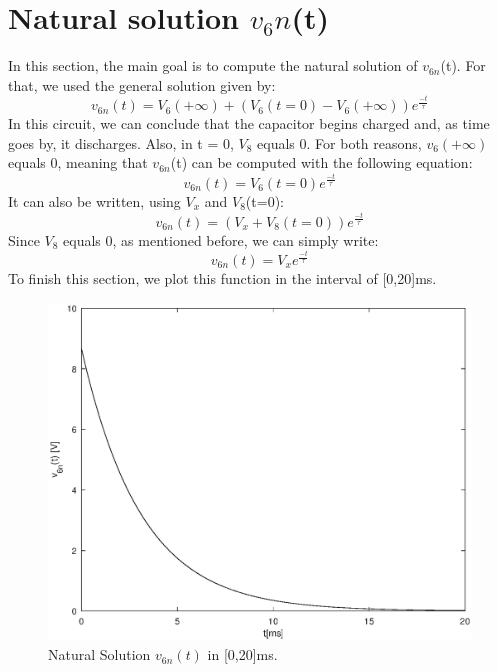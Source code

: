 \newpage
\section{Natural solution $v_6n$(t)}
In this section, the main goal is to compute the natural solution of $v_{6n}$(t). For that, we used the general solution given by:
\begin{equation}
v_{6n}(t) = V_6(+\infty) + (V_6(t=0) - V_6(+\infty))e^{\frac{-t}{\tau}}
  \label{eq:v6ncomplete}
\end{equation}
In this circuit, we can conclude that the capacitor begins charged and, as time goes by, it discharges. Also, in t = 0, $V_8$ equals 0. 
For both reasons, $v_6(+\infty)$ equals 0, meaning that $v_{6n}$(t) can be computed with the following equation:
\begin{equation}
v_{6n}(t) = V_6(t=0)e^{\frac{-t}{\tau}}
  \label{eq:v6nfinal}
\end{equation}
It can also be written, using $V_x$ and $V_8$(t=0):
\begin{equation}
v_{6n}(t) = (V_x + V_8(t=0))e^{\frac{-t}{\tau}}
  \label{eq:v6nwithv8vx}
\end{equation}
Since $V_8$ equals 0, as mentioned before, we can simply write:
\begin{equation}
v_{6n}(t) = V_xe^{\frac{-t}{\tau}}
  \label{eq:v6nwithvx}
\end{equation}
To finish this section, we plot this function in the interval of [0,20]ms.
\begin{figure}[h!] \centering
\includegraphics[width=0.8\linewidth]{v6n.eps}
\caption{Natural Solution $v_{6n}(t)$ in [0,20]ms.}
\label{fig:v6n}
\end{figure}

\newpage
